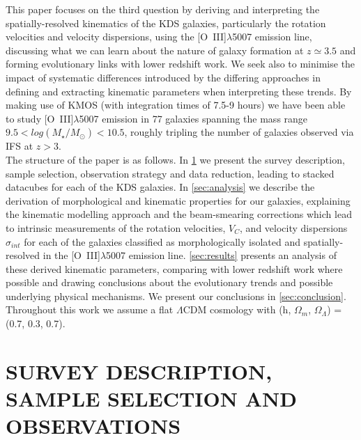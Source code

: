 \documentclass[fleqn,usenatbib]{mn2e}
\begin{document}
This paper focuses on the third question by deriving and interpreting the spatially-resolved kinematics of the KDS galaxies, particularly the rotation velocities and velocity dispersions, using the [O~{\sc III}]$\lambda$5007 emission line, discussing what we can learn about the nature of galaxy formation at $z\simeq3.5$ and forming evolutionary links with lower redshift work.
We seek also to minimise the impact of systematic differences introduced by the differing approaches in defining and extracting kinematic parameters when interpreting these trends.  
By making use of KMOS (with integration times of 7.5-9 hours) we have been able to study [O~{\sc III}]$\lambda$5007 emission in 77 galaxies spanning the mass range $9.5 < log(M_{\star}/M_{\odot}) < 10.5$, roughly tripling the number of galaxies observed via IFS at $z > 3$. \\

The structure of the paper is as follows. In \cref{sec:Survey_and_data} we present the survey description, sample selection, observation strategy and data reduction, leading to stacked datacubes for each of the KDS galaxies.
In \cref{sec:analysis} we describe the derivation of morphological and kinematic properties for our galaxies, explaining the kinematic modelling approach and the beam-smearing corrections which lead to intrinsic measurements of the rotation velocities, $V_{C}$, and velocity dispersions $\sigma_{int}$ for each of the galaxies classified as morphologically isolated and spatially-resolved in the [O~{\sc III}]$\lambda$5007 emission line.
\cref{sec:results} presents an analysis of these derived kinematic parameters, comparing with lower redshift work where possible and drawing conclusions about the evolutionary trends and possible underlying physical mechanisms.
We present our conclusions in \cref{sec:conclusion}.
Throughout this work we assume a flat $\Lambda$CDM cosmology with (h, $\Omega_{m}$, $\Omega_{\Lambda}$) = (0.7, 0.3, 0.7). 

\section{SURVEY DESCRIPTION, SAMPLE SELECTION AND OBSERVATIONS}\label{sec:Survey_and_data}
\end{document}
